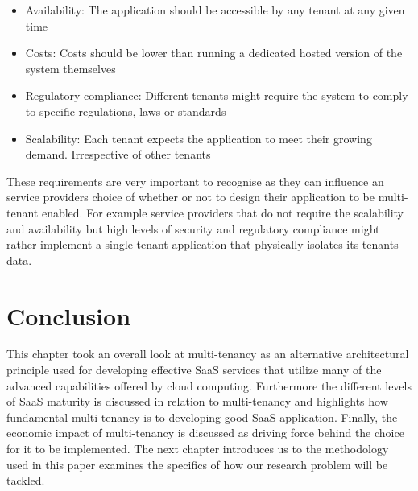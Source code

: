 \begin{itemize}
\item Availability: The application should be accessible by any tenant at any given time
\item Costs: Costs should be lower than running a dedicated hosted version of the system themselves
\item Regulatory compliance: Different tenants might require the system to comply to specific regulations, laws or standards
\item Scalability: Each tenant expects the application to meet their growing demand. Irrespective of other tenants
\end{itemize}
These requirements are very important to recognise as they can influence an service providers choice of whether or not to design their application to be multi-tenant enabled. For example service providers that do not require the scalability and availability but high levels of security and regulatory compliance might rather implement a single-tenant application that physically isolates its tenants data. 


\section{Conclusion}
This chapter took an overall look at multi-tenancy as an alternative architectural principle used for developing effective SaaS services that utilize many of the advanced capabilities offered by cloud computing. Furthermore the different levels of SaaS maturity is discussed in relation to multi-tenancy and highlights how fundamental multi-tenancy is to developing good SaaS application. Finally, the economic impact of multi-tenancy is discussed as driving force behind the choice for it to be implemented. The next chapter introduces us to the methodology used in this paper examines the specifics of how our research problem will be tackled. 